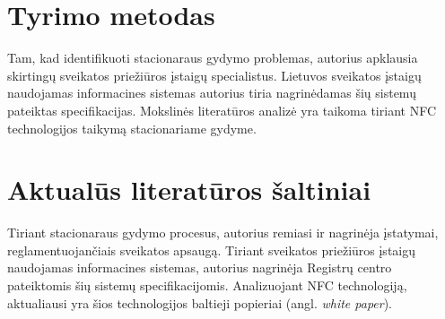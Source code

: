 \documentclass{VUMIFPSbakalaurinis}
\begin{document}
\section{Tyrimo metodas} 
Tam, kad identifikuoti stacionaraus gydymo problemas, autorius apklausia skirtingų sveikatos priežiūros įstaigų specialistus. Lietuvos sveikatos įstaigų naudojamas informacines sistemas autorius tiria nagrinėdamas šių sistemų pateiktas specifikacijas. Mokslinės literatūros analizė yra taikoma tiriant NFC technologijos taikymą stacionariame gydyme.

\section{Aktualūs literatūros šaltiniai} 
Tiriant stacionaraus gydymo procesus, autorius remiasi ir nagrinėja įstatymai, reglamentuojančiais sveikatos apsaugą. Tiriant sveikatos priežiūros įstaigų naudojamas informacines sistemas, autorius nagrinėja Registrų centro pateiktomis šių sistemų specifikacijomis. Analizuojant NFC technologiją, aktualiausi yra šios technologijos baltieji popieriai (angl. \textit{white paper}).

\newpage
% 

% 




\printbibliography[heading=bibintoc]  %
\end{document}
